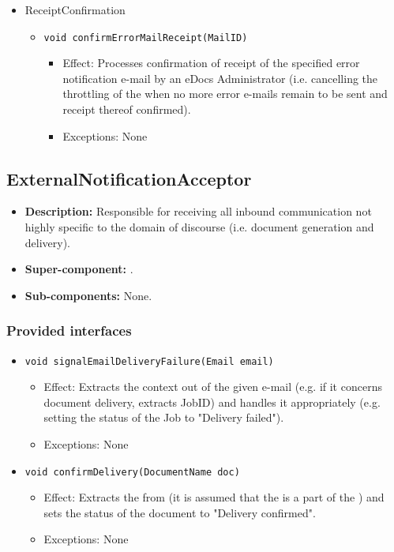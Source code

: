 \begin{itemize}
	\item ReceiptConfirmation
    \begin{itemize}
        \item \texttt{void confirmErrorMailReceipt(MailID)}
        \begin{itemize}
            \item Effect: Processes confirmation of receipt of the specified error notification e-mail by an eDocs Administrator (i.e. cancelling the throttling of the  when no more error e-mails remain to be sent and receipt thereof confirmed).
            \item Exceptions: None
        \end{itemize}
    \end{itemize}
\end{itemize}

\subsection{ExternalNotificationAcceptor}
\begin{itemize}
    \item \textbf{Description:} Responsible for receiving all inbound communication not highly specific to the domain of discourse (i.e. document generation and delivery).
    \item \textbf{Super-component:} .
    \item \textbf{Sub-components:} None.
\end{itemize}

\subsubsection*{Provided interfaces}
\begin{itemize}
    \item \texttt{void signalEmailDeliveryFailure(Email email)}
        \begin{itemize}
            \item Effect: Extracts the context out of the given e-mail (e.g. if it concerns document delivery, extracts JobID) and handles it appropriately (e.g. setting the status of the Job to "Delivery failed").
            \item Exceptions: None
        \end{itemize}

		\item \texttt{void confirmDelivery(DocumentName doc)}
        \begin{itemize}
            \item Effect: Extracts the  from  (it is assumed that the  is a part of the ) and sets the status of the document to "Delivery confirmed".
            \item Exceptions: None
        \end{itemize}
\end{itemize}

